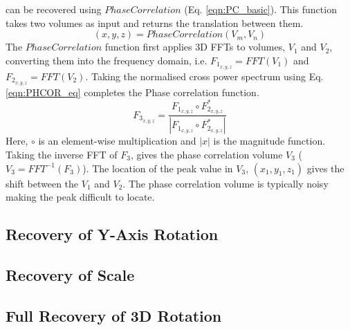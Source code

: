  can be recovered using $PhaseCorrelation$ (Eq. \ref{eqn:PC_basic}). This function takes two volumes as input and returns the translation between them.
\begin{equation} \label{eqn:PC_basic}
(x, y, z) = PhaseCorrelation(V_m, V_n)
\end{equation}
The $PhaseCorrelation$ function first applies 3D FFTs to volumes, $V_1$ and $V_2$, converting them into the frequency domain, i.e. $F_{1_{x,y,z}} = FFT(V_1)$ and $F_{2_{x,y,z}} = FFT(V_2)$. Taking the normalised cross power spectrum using Eq. \ref{eqn:PHCOR_eq} completes the Phase correlation function. 
\begin{equation} \label{eqn:PHCOR_eq}
F_{3_{x,y,z}} = \frac{F_{1_{x,y,z}} \circ F_{2_{x,y,z}}^*}{ | F_{1_{x,y,z}} \circ F_{2_{x,y,z}}^* | }
\end{equation}
Here, $\circ$ is an element-wise multiplication and $|x|$ is the magnitude function. Taking the inverse FFT of $F_3$, gives the phase correlation volume $V_3$ ($V_3 = FFT^{-1}(F_3)$). The location of the peak value in $V_3$, $(x_1, y_1, z_1)$ gives the shift between the $V_1$ and $V_2$. The phase correlation volume is typically noisy making the peak difficult to locate. 


\subsection{Recovery of Y-Axis Rotation}

\subsection{Recovery of Scale}

\subsection{Full Recovery of 3D Rotation}
